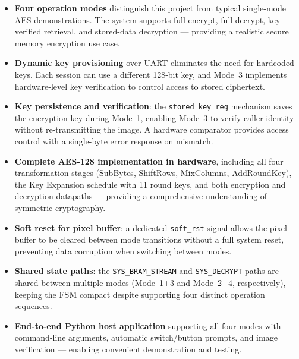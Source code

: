 \documentclass[12pt,a4paper]{article}
\begin{document}
\begin{itemize}
    \item \textbf{Four operation modes} distinguish this project from typical single-mode AES demonstrations. The system supports full encrypt, full decrypt, key-verified retrieval, and stored-data decryption — providing a realistic secure memory encryption use case.
    
    \item \textbf{Dynamic key provisioning} over UART eliminates the need for hardcoded keys. Each session can use a different 128-bit key, and Mode~3 implements hardware-level key verification to control access to stored ciphertext.
    
    \item \textbf{Key persistence and verification}: the \texttt{stored\_key\_reg} mechanism saves the encryption key during Mode~1, enabling Mode~3 to verify caller identity without re-transmitting the image. A hardware comparator provides access control with a single-byte error response on mismatch.
    
    \item \textbf{Complete AES-128 implementation in hardware}, including all four transformation stages (SubBytes, ShiftRows, MixColumns, AddRoundKey), the Key Expansion schedule with 11 round keys, and both encryption and decryption datapaths — providing a comprehensive understanding of symmetric cryptography.
    
    \item \textbf{Soft reset for pixel buffer}: a dedicated \texttt{soft\_rst} signal allows the pixel buffer to be cleared between mode transitions without a full system reset, preventing data corruption when switching between modes.
    
    \item \textbf{Shared state paths}: the \texttt{SYS\_BRAM\_STREAM} and \texttt{SYS\_DECRYPT} paths are shared between multiple modes (Mode~1+3 and Mode~2+4, respectively), keeping the FSM compact despite supporting four distinct operation sequences.
    
    \item \textbf{End-to-end Python host application} supporting all four modes with command-line arguments, automatic switch/button prompts, and image verification — enabling convenient demonstration and testing.
\end{itemize}


\end{document}
